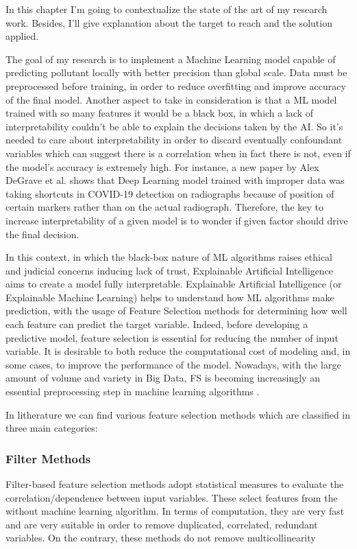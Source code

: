 In this chapter I'm going to contextualize the state of the art of my research work. 
Besides, I'll give explanation about the target to reach and the solution applied.\par
The goal of my research is to implement a Machine Learning model capable of predicting pollutant locally with better precision than global scale. 
Data must be preprocessed before training, in order to reduce overfitting and improve accuracy of the final model.
Another aspect to take in consideration is that a ML model trained with so many features it would be a black box, in which a lack of interpretability couldn't be able to explain the decisions taken by the AI.
So it's needed to care about interpretability in order to discard eventually confoundant variables  which can suggest there is a correlation when in fact there is not, even if the model's accuracy is extremely high. 
For instance, a new paper by Alex DeGrave et al.\cite{degrave2021ai} shows that Deep Learning model trained with improper data was taking shortcuts in COVID-19 detection on radiographs because of position of certain markers rather than on the actual radiograph.
Therefore, the key to increase interpretability of a given model is to wonder if given factor should drive the final decision.\par
In this context, in which the black-box nature of ML algorithms raises ethical and judicial concerns inducing lack of trust, Explainable Artificial Intelligence aims to create a model fully interpretable.
Explainable Artificial Intelligence (or Explainable Machine Learning) helps to understand how ML algorithms make prediction, with the usage of Feature Selection methods for determining how well each feature can predict the target variable.
Indeed, before developing a predictive model, feature selection is essential for reducing the number of input variable. 
It is desirable to both reduce the computational cost of modeling and, in some cases, to improve the performance of the model.
Nowadays, with the large amount of volume and variety in Big Data, FS is becoming increasingly an essential preprocessing step in machine learning algorithms \cite{kamolov2021feature}.
\par
In litherature we can find various feature selection methods which are classified in three main categories\cite{stanczyk2015feature}:
\subsubsection{Filter Methods}
Filter-based feature selection methods adopt statistical measures to evaluate the correlation/dependence between input variables.
These select features from the without machine learning algorithm. In terms of computation, they are very fast and are very suitable in order to remove duplicated, correlated, redundant variables. On the contrary, these methods do not remove multicollinearity
